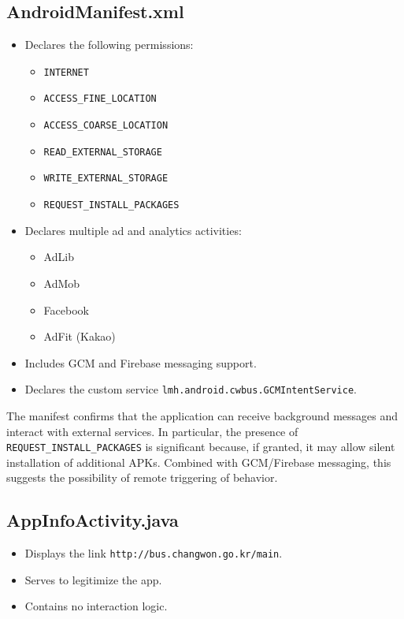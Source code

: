 \subsection{AndroidManifest.xml}
\begin{itemize}
    \item Declares the following permissions:
    \begin{itemize}
        \item \texttt{INTERNET}
        \item \texttt{ACCESS\_FINE\_LOCATION}
        \item \texttt{ACCESS\_COARSE\_LOCATION}
        \item \texttt{READ\_EXTERNAL\_STORAGE}
        \item \texttt{WRITE\_EXTERNAL\_STORAGE}
        \item \texttt{REQUEST\_INSTALL\_PACKAGES}
    \end{itemize}
    \item Declares multiple ad and analytics activities:
    \begin{itemize}
        \item AdLib
        \item AdMob
        \item Facebook
        \item AdFit (Kakao)
    \end{itemize}
    \item Includes GCM and Firebase messaging support.
    \item Declares the custom service \texttt{lmh.android.cwbus.GCMIntentService}.
\end{itemize}

The manifest confirms that the application can receive background messages and interact with external services. In particular, the presence of \texttt{REQUEST\_INSTALL\_PACKAGES} is significant because, if granted, it may allow silent installation of additional APKs. Combined with GCM/Firebase messaging, this suggests the possibility of remote triggering of behavior.

\subsection{AppInfoActivity.java}
\begin{itemize}
    \item Displays the link \texttt{http://bus.changwon.go.kr/main}.
    \item Serves to legitimize the app.
    \item Contains no interaction logic.
\end{itemize}


